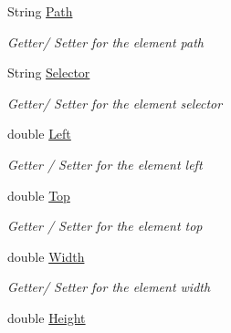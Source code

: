 \begin{DoxyCompactItemize}
String \hyperlink{class_web_analyzer_1_1_models_1_1_data_model_1_1_d_o_m_element_model_a51a4d9000890ebe19b35812780d3bf92}{Path}
\begin{DoxyCompactList}\small\item\em Getter/ Setter for the element path \end{DoxyCompactList}\item 
String \hyperlink{class_web_analyzer_1_1_models_1_1_data_model_1_1_d_o_m_element_model_a0de31ca5aa5fef2bf8ddcacef47cb379}{Selector}
\begin{DoxyCompactList}\small\item\em Getter/ Setter for the element selector \end{DoxyCompactList}\item 
double \hyperlink{class_web_analyzer_1_1_models_1_1_data_model_1_1_d_o_m_element_model_a8dffe5cd2a8e688eaf4f2f50a39dc07d}{Left}
\begin{DoxyCompactList}\small\item\em Getter / Setter for the element left \end{DoxyCompactList}\item 
double \hyperlink{class_web_analyzer_1_1_models_1_1_data_model_1_1_d_o_m_element_model_a1f17dcaf6e924292f3b6a8ade726941d}{Top}
\begin{DoxyCompactList}\small\item\em Getter / Setter for the element top \end{DoxyCompactList}\item 
double \hyperlink{class_web_analyzer_1_1_models_1_1_data_model_1_1_d_o_m_element_model_a34aa9812237c151017294753a8ee77a7}{Width}
\begin{DoxyCompactList}\small\item\em Getter/ Setter for the element width \end{DoxyCompactList}\item 
double \hyperlink{class_web_analyzer_1_1_models_1_1_data_model_1_1_d_o_m_element_model_aa5965b140e814fe18f8b9551f1a66b73}{Height}

\end{DoxyCompactItemize}
